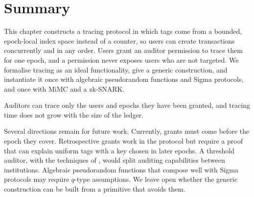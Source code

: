 \FloatBarrier
\section{Summary}\label{sec:txid-summary}

This chapter constructs a tracing protocol in which tags come from a
bounded, epoch-local index space instead of a counter, so users can create
transactions concurrently and in any order. Users grant an auditor permission
to trace them for one epoch, and a permission never exposes users who are not
targeted. We formalise tracing as an ideal functionality, give a generic
construction, and instantiate it once with algebraic pseudorandom functions
and Sigma protocols, and once with MiMC and a zk-SNARK.

Auditors can trace only the users and epochs they have been granted, and tracing
time does not grow with the size of
the ledger.

Several directions remain for future work. Currently, grants must come before
the epoch they cover. Retrospective grants work in the protocol but require a
proof that can explain uniform tags with a key chosen in later epochs. A
threshold auditor, with the techniques of , would split
auditing capabilities between institutions.  Algebraic pseudorandom functions
that compose well with Sigma protocols may require $q$-type assumptions. We leave open
whether the generic construction can be built from a primitive that avoids
them.
